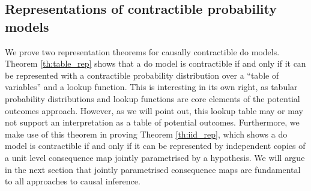 






\subsection{Representations of contractible probability models}

We prove two representation theorems for causally contractible do models. Theorem \ref{th:table_rep} shows that a do model is contractible if and only if it can be represented with a contractible probability distribution over a ``table of variables'' and a lookup function. This is interesting in its own right, as tabular probability distributions and lookup functions are core elements of the potential outcomes approach. However, as we will point out, this lookup table may or may not support an interpretation as a table of potential outcomes. Furthermore, we make use of this theorem in proving Theorem \ref{th:iid_rep}, which shows a do model is contractible if and only if it can be represented by independent copies of a unit level consequence map jointly parametrised by a hypothesis. We will argue in the next section that jointly parametrised consequence maps are fundamental to all approaches to causal inference.

